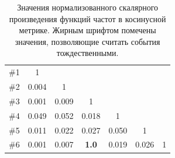 \documentclass[12pt, a4paper]{article}
\begin{document}
	\begin{table}[H]
	\centering
	\begin{tabular}{ r | c  c  c  c  c  c }
		\#1 & 1 & & & & & \\
		\#2 & 0.004 & 1 & & & & \\ 
		\#3 & 0.001 & 0.009 & 1 & & & \\ 
		\#4 & 0.049 & 0.052 & 0.018 & 1 & & \\
		\#5 & 0.011 & 0.022 & 0.027 & 0.050 & 1 & \\
		\#6 & 0.001 & 0.007 & \textbf{1.0} & 0.019 & 0.026 & 1 \\
	\end{tabular}
	\caption{Значения нормализованного скалярного произведения функций частот в косинусной метрике. Жирным шрифтом помечены значения, позволяющие считать события тождественными.}
	\label{dotprod-table}
	\end{table}
	
\end{document}
